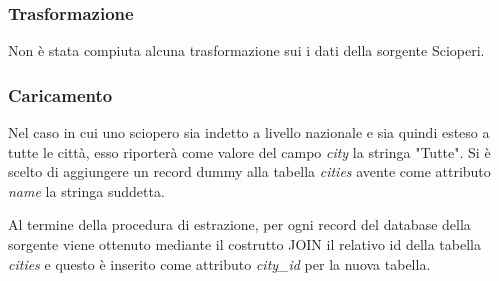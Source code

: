 \subsubsection{Trasformazione}

Non è stata compiuta alcuna trasformazione sui i dati della sorgente Scioperi.

\subsubsection{Caricamento}

Nel caso in cui uno sciopero sia indetto a livello nazionale e sia quindi esteso
a tutte le città, esso riporterà come valore del campo \textit{city} la stringa 
"Tutte". Si è scelto di aggiungere un record dummy alla tabella \textit{cities}
avente come attributo \textit{name} la stringa suddetta.

Al termine della procedura di estrazione, per ogni record del database della
sorgente viene ottenuto mediante il costrutto JOIN il relativo id della tabella
\textit{cities} e questo è inserito come attributo \textit{city\_id} per la
nuova tabella.
